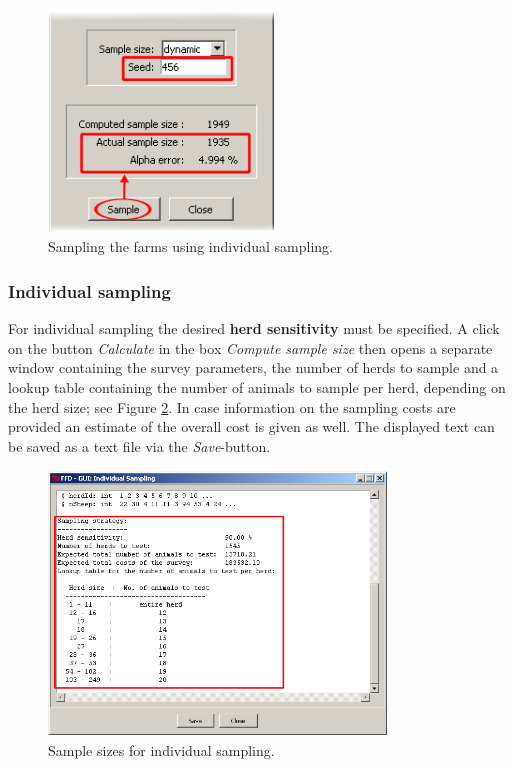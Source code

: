 \documentclass[nojss]{jss}
\begin{document}
\begin{figure}[h!t]
\begin{center}
\includegraphics[width=60mm]{GUI_sample_ltd2.png}
\end{center}
\caption{Sampling the farms using individual sampling.} \label{fig:GUI_sample_ltd2}
\end{figure}


\subsubsection{Individual sampling}

For individual sampling the desired \textbf{herd sensitivity} must be specified. A click on the button \emph{Calculate} in the box \emph{Compute sample size} then opens a separate window containing the survey parameters, the number of herds to sample and a lookup table containing the number of animals to sample per herd, depending on the herd size; see Figure \ref{fig:GUI_calc_ind2}. In case information on the sampling costs are provided an estimate of the overall cost is given as well. The displayed text can be saved as a text file via the \emph{Save}-button.

\begin{figure}[h!t]
\begin{center}
\includegraphics[width=90mm]{GUI_calc_ind2.png}
\end{center} \caption{Sample sizes for individual sampling.} \label{fig:GUI_calc_ind2}
\end{figure}
\end{document}
